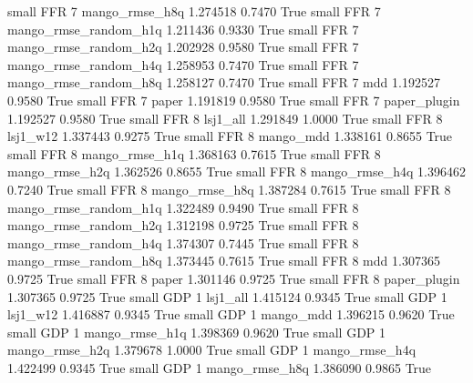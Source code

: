      small      FFR                 7        mango_rmse_h8q   1.274518      0.7470    True
     small      FFR                 7 mango_rmse_random_h1q   1.211436      0.9330    True
     small      FFR                 7 mango_rmse_random_h2q   1.202928      0.9580    True
     small      FFR                 7 mango_rmse_random_h4q   1.258953      0.7470    True
     small      FFR                 7 mango_rmse_random_h8q   1.258127      0.7470    True
     small      FFR                 7                   mdd   1.192527      0.9580    True
     small      FFR                 7                 paper   1.191819      0.9580    True
     small      FFR                 7          paper_plugin   1.192527      0.9580    True
     small      FFR                 8              lsj1_all   1.291849      1.0000    True
     small      FFR                 8              lsj1_w12   1.337443      0.9275    True
     small      FFR                 8             mango_mdd   1.338161      0.8655    True
     small      FFR                 8        mango_rmse_h1q   1.368163      0.7615    True
     small      FFR                 8        mango_rmse_h2q   1.362526      0.8655    True
     small      FFR                 8        mango_rmse_h4q   1.396462      0.7240    True
     small      FFR                 8        mango_rmse_h8q   1.387284      0.7615    True
     small      FFR                 8 mango_rmse_random_h1q   1.322489      0.9490    True
     small      FFR                 8 mango_rmse_random_h2q   1.312198      0.9725    True
     small      FFR                 8 mango_rmse_random_h4q   1.374307      0.7445    True
     small      FFR                 8 mango_rmse_random_h8q   1.373445      0.7615    True
     small      FFR                 8                   mdd   1.307365      0.9725    True
     small      FFR                 8                 paper   1.301146      0.9725    True
     small      FFR                 8          paper_plugin   1.307365      0.9725    True
     small      GDP                 1              lsj1_all   1.415124      0.9345    True
     small      GDP                 1              lsj1_w12   1.416887      0.9345    True
     small      GDP                 1             mango_mdd   1.396215      0.9620    True
     small      GDP                 1        mango_rmse_h1q   1.398369      0.9620    True
     small      GDP                 1        mango_rmse_h2q   1.379678      1.0000    True
     small      GDP                 1        mango_rmse_h4q   1.422499      0.9345    True
     small      GDP                 1        mango_rmse_h8q   1.386090      0.9865    True
